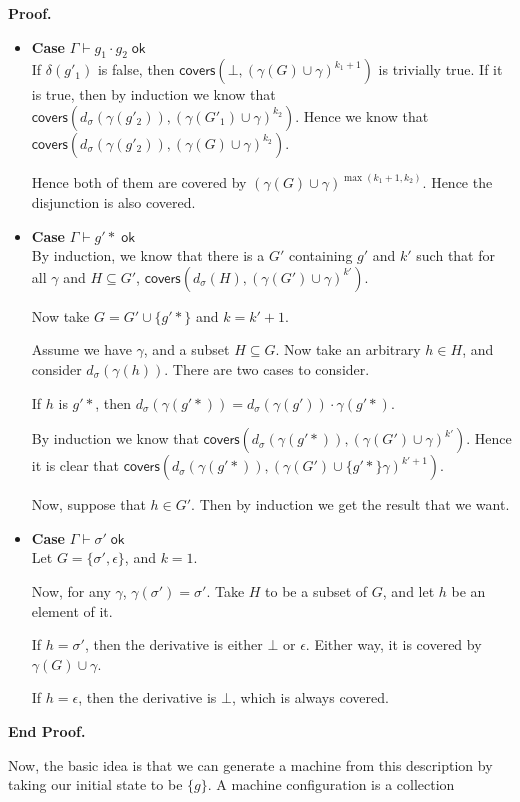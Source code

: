 \documentclass{article}
\newcommand{\judgeok}[2][\Gamma]{{#1} \vdash {#2} \;\mathsf{ok}}
\newcommand{\setof}[1]{\{{#1}\}}
\newcommand{\deriv}[2]{d_{#1}({#2})}
\newcommand{\emptify}[1]{\delta({#1})}
\newcommand{\covers}[2]{\mathsf{covers}({#1}, {#2})}
\newenvironment{proof}{\noindent\textbf{Proof.}}{\noindent\textbf{End Proof.}}
\newenvironment{caseblock}{\begin{itemize}}{\end{itemize}}
\newenvironment{case}[1]{\item \textbf{Case} {#1}\\}{}
\begin{document}
\begin{proof}
\begin{caseblock}
\begin{case}{$\judgeok{g_1\cdot g_2}$}
      If $\emptify{g'_1}$ is false, then
      $\covers{\bot}{(\gamma(G)\cup\gamma)^{k_1 + 1}}$ is trivially
      true.  If it is true, then by induction we know that
      $\covers{\deriv{\sigma}{\gamma(g'_2)}}{(\gamma(G'_1)\cup
        \gamma)^{k_2}}$. Hence we know that
      $\covers{\deriv{\sigma}{\gamma(g'_2)}}{(\gamma(G)\cup
        \gamma)^{k_2}}$.

      Hence both of them are covered by $(\gamma(G)\cup
      \gamma)^{\max(k_1+1,k_2)}$. Hence the disjunction is also
      covered.
    \end{case}

    \begin{case}{$\judgeok{g'*}$}
      By induction, we know that there is a $G'$ containing $g'$ and
      $k'$ such that for all $\gamma$ and $H \subseteq G'$,
      $\covers{\deriv{\sigma}{H}}{(\gamma(G') \cup \gamma)^{k'}}$. 

      Now take $G = G' \cup \setof{g'*}$ and $k = k'+1$. 

      Assume we have $\gamma$, and a subset $H \subseteq G$. Now take an
      arbitrary $h \in H$, and consider $\deriv{\sigma}{\gamma(h)}$. There
      are two cases to consider. 

      If $h$ is $g'*$, then $\deriv{\sigma}{\gamma(g'*)} = \deriv{\sigma}{\gamma(g')}\cdot\gamma(g'*)$. 

      By induction we know that $\covers{\deriv{\sigma}{\gamma(g'*)}}{(\gamma(G') \cup \gamma)^{k'}}$. 
      Hence it is clear that $\covers{\deriv{\sigma}{\gamma(g'*)}}{(\gamma(G') \cup \setof{g'*} \gamma)^{k'+1}}$. 

      Now, suppose that $h \in G'$. Then by induction we get the result that we want. 
    \end{case}

    \begin{case}{$\judgeok{\sigma'}$}
      Let $G = \setof{\sigma', \epsilon}$, and $k = 1$. 

      Now, for any $\gamma$, $\gamma(\sigma') = \sigma'$. Take $H$ to be 
      a subset of $G$, and let $h$ be an element of it. 

      If $h = \sigma'$, then the derivative is either $\bot$ or $\epsilon$. 
      Either way, it is covered by $\gamma(G) \cup \gamma$.  

      If $h = \epsilon$, then the derivative is $\bot$, which is always
      covered. 
    \end{case}

  \end{caseblock}
\end{proof}

Now, the basic idea is that we can generate a machine from this
description by taking our initial state to be $\setof{g}$. A machine
configuration is a collection 
\end{document}
